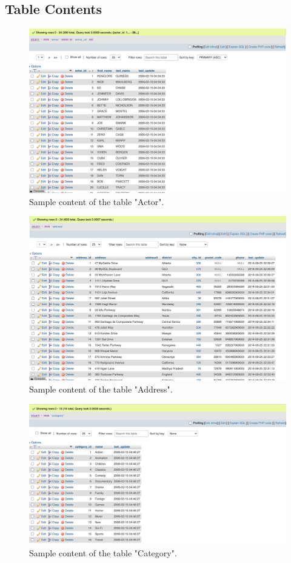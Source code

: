 \documentclass{article}
\begin{document}
	\subsection{Table Contents}
		\begin{figure}[H]
			\includegraphics[width=\textwidth]{actor_content}
			\caption{Sample content of the table "Actor".}
		\end{figure}
		\begin{figure}[H]
			\includegraphics[width=\textwidth]{address_content}
			\caption{Sample content of the table "Address".}
		\end{figure}
		\begin{figure}[H]
			\includegraphics[width=\textwidth]{category_content}
			\caption{Sample content of the table "Category".}
		\end{figure}
\end{document}

